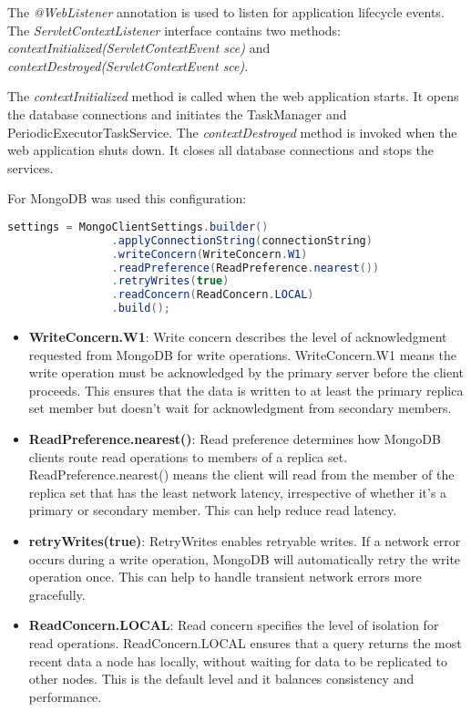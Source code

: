\vspace{\baselineskip}

\sloppy
The \textit{@WebListener} annotation is used to listen for application lifecycle events. 
The \textit{ServletContextListener} interface contains two methods: \textit{contextInitialized(ServletContextEvent sce)} 
and \textit{contextDestroyed(ServletContextEvent sce)}. 

\vspace{\baselineskip}

The \textit{contextInitialized} method is called when the web application starts. It opens the database 
connections and initiates the TaskManager and PeriodicExecutorTaskService. The \textit{contextDestroyed} 
method is invoked when the web application shuts down. It closes all database connections and stops the services.

\vspace{\baselineskip}

For MongoDB was used this configuration:

\begin{mdframed}[style=customstyle]
    \begin{lstlisting}[language=java]
    settings = MongoClientSettings.builder()
                .applyConnectionString(connectionString)
                .writeConcern(WriteConcern.W1)
                .readPreference(ReadPreference.nearest())
                .retryWrites(true)
                .readConcern(ReadConcern.LOCAL)
                .build();\end{lstlisting}
\end{mdframed}

\begin{itemize}
    \item \textbf{WriteConcern.W1}: Write concern describes the level of acknowledgment requested from MongoDB for write operations. 
    WriteConcern.W1 means the write operation must be acknowledged by the primary server before the client proceeds. 
    This ensures that the data is written to at least the primary replica set member but doesn't wait for 
    acknowledgment from secondary members.
    \item \textbf{ReadPreference.nearest()}: Read preference determines how MongoDB clients route read operations 
    to members of a replica set. ReadPreference.nearest() means the client will read from the member of the replica 
    set that has the least network latency, irrespective of whether it's a primary or secondary member. This can help 
    reduce read latency.
    \item \textbf{retryWrites(true)}: RetryWrites enables retryable writes. If a network error occurs during a write 
    operation, MongoDB will automatically retry the write operation once. This can help to handle transient network 
    errors more gracefully.
    \item \textbf{ReadConcern.LOCAL}: Read concern specifies the level of isolation for read operations. 
    ReadConcern.LOCAL ensures that a query returns the most recent data a node has locally, without waiting 
    for data to be replicated to other nodes. This is the default level and it balances consistency and performance.
\end{itemize}

